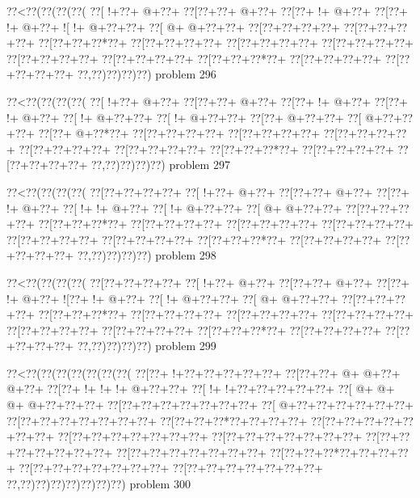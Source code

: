 \vbox{\vbox{\goo
\0??<\0??(\0??(\0??(\0??(
\0??[\- !+\0??+\- @+\0??+
\0??[\0??+\0??+\- @+\0??+
\0??[\0??+\- !+\- @+\0??+
\0??[\0??+\- !+\- @+\0??+
\- ![\- !+\- @+\0??+\0??+
\0??[\- @+\- @+\0??+\0??+
\0??[\0??+\0??+\0??+\0??+
\0??[\0??+\0??+\0??+\0??+
\0??[\0??+\0??+\0??*\0??+
\0??[\0??+\0??+\0??+\0??+
\0??[\0??+\0??+\0??+\0??+
\0??[\0??+\0??+\0??+\0??+
\0??[\0??+\0??+\0??+\0??+
\0??[\0??+\0??+\0??+\0??+
\0??[\0??+\0??+\0??*\0??+
\0??[\0??+\0??+\0??+\0??+
\0??[\0??+\0??+\0??+\0??+
\0??,\0??)\0??)\0??)\0??)
}
\hfil problem 296\hfil\break
}

\vbox{\vbox{\goo
\0??<\0??(\0??(\0??(\0??(
\0??[\- !+\0??+\- @+\0??+
\0??[\0??+\0??+\- @+\0??+
\0??[\0??+\- !+\- @+\0??+
\0??[\0??+\- !+\- @+\0??+
\0??[\- !+\- @+\0??+\0??+
\0??[\- !+\- @+\0??+\0??+
\0??[\0??+\- @+\0??+\0??+
\0??[\- @+\0??+\0??+\0??+
\0??[\0??+\- @+\0??*\0??+
\0??[\0??+\0??+\0??+\0??+
\0??[\0??+\0??+\0??+\0??+
\0??[\0??+\0??+\0??+\0??+
\0??[\0??+\0??+\0??+\0??+
\0??[\0??+\0??+\0??+\0??+
\0??[\0??+\0??+\0??*\0??+
\0??[\0??+\0??+\0??+\0??+
\0??[\0??+\0??+\0??+\0??+
\0??,\0??)\0??)\0??)\0??)
}
\hfil problem 297\hfil\break
}

\vbox{\vbox{\goo
\0??<\0??(\0??(\0??(\0??(
\0??[\0??+\0??+\0??+\0??+
\0??[\- !+\0??+\- @+\0??+
\0??[\0??+\0??+\- @+\0??+
\0??[\0??+\- !+\- @+\0??+
\0??[\- !+\- !+\- @+\0??+
\0??[\- !+\- @+\0??+\0??+
\0??[\- @+\- @+\0??+\0??+
\0??[\0??+\0??+\0??+\0??+
\0??[\0??+\0??+\0??*\0??+
\0??[\0??+\0??+\0??+\0??+
\0??[\0??+\0??+\0??+\0??+
\0??[\0??+\0??+\0??+\0??+
\0??[\0??+\0??+\0??+\0??+
\0??[\0??+\0??+\0??+\0??+
\0??[\0??+\0??+\0??*\0??+
\0??[\0??+\0??+\0??+\0??+
\0??[\0??+\0??+\0??+\0??+
\0??,\0??)\0??)\0??)\0??)
}
\hfil problem 298\hfil\break
}

\vbox{\vbox{\goo
\0??<\0??(\0??(\0??(\0??(
\0??[\0??+\0??+\0??+\0??+
\0??[\- !+\0??+\- @+\0??+
\0??[\0??+\0??+\- @+\0??+
\0??[\0??+\- !+\- @+\0??+
\- ![\0??+\- !+\- @+\0??+
\0??[\- !+\- @+\0??+\0??+
\0??[\- @+\- @+\0??+\0??+
\0??[\0??+\0??+\0??+\0??+
\0??[\0??+\0??+\0??*\0??+
\0??[\0??+\0??+\0??+\0??+
\0??[\0??+\0??+\0??+\0??+
\0??[\0??+\0??+\0??+\0??+
\0??[\0??+\0??+\0??+\0??+
\0??[\0??+\0??+\0??+\0??+
\0??[\0??+\0??+\0??*\0??+
\0??[\0??+\0??+\0??+\0??+
\0??[\0??+\0??+\0??+\0??+
\0??,\0??)\0??)\0??)\0??)
}
\hfil problem 299\hfil\break
}

\vbox{\vbox{\goo
\0??<\0??(\0??(\0??(\0??(\0??(\0??(\0??(
\0??[\0??+\- !+\0??+\0??+\0??+\0??+\0??+
\0??[\0??+\0??+\- @+\- @+\0??+\- @+\0??+
\0??[\0??+\- !+\- !+\- !+\- @+\0??+\0??+
\0??[\- !+\- !+\0??+\0??+\0??+\0??+\0??+
\0??[\- @+\- @+\- @+\- @+\0??+\0??+\0??+
\0??[\0??+\0??+\0??+\0??+\0??+\0??+\0??+
\0??[\- @+\0??+\0??+\0??+\0??+\0??+\0??+
\0??[\0??+\0??+\0??+\0??+\0??+\0??+\0??+
\0??[\0??+\0??+\0??*\0??+\0??+\0??+\0??+
\0??[\0??+\0??+\0??+\0??+\0??+\0??+\0??+
\0??[\0??+\0??+\0??+\0??+\0??+\0??+\0??+
\0??[\0??+\0??+\0??+\0??+\0??+\0??+\0??+
\0??[\0??+\0??+\0??+\0??+\0??+\0??+\0??+
\0??[\0??+\0??+\0??+\0??+\0??+\0??+\0??+
\0??[\0??+\0??+\0??*\0??+\0??+\0??+\0??+
\0??[\0??+\0??+\0??+\0??+\0??+\0??+\0??+
\0??[\0??+\0??+\0??+\0??+\0??+\0??+\0??+
\0??,\0??)\0??)\0??)\0??)\0??)\0??)\0??)
}
\hfil problem 300\hfil\break
}

